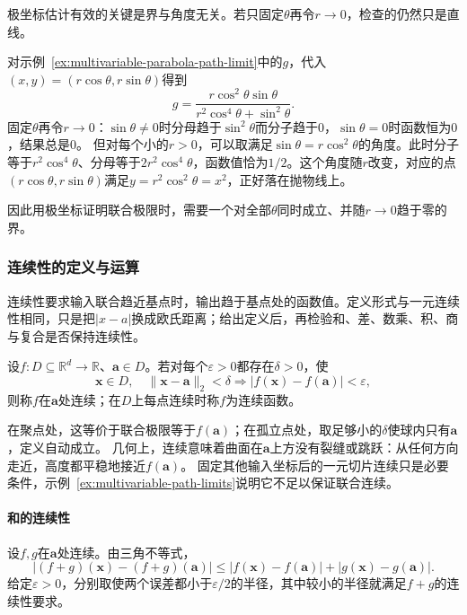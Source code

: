 极坐标估计有效的关键是界与角度无关。若只固定$\theta$再令$r\to0$，检查的仍然只是直线。
\begin{example}[固定角度的极坐标检验]
\label{ex:multivariable-polar-fixed-angle}
对示例~\ref{ex:multivariable-parabola-path-limit}中的$g$，代入$(x,y)=(r\cos\theta,r\sin\theta)$得到
\[
 g=\frac{r\cos^2\theta\sin\theta}{r^2\cos^4\theta+\sin^2\theta}.
\]
固定$\theta$再令$r\to0$：$\sin\theta\neq0$时分母趋于$\sin^2\theta$而分子趋于$0$，$\sin\theta=0$时函数恒为$0$，结果总是$0$。
但对每个小的$r>0$，可以取满足$\sin\theta=r\cos^2\theta$的角度。此时分子等于$r^2\cos^4\theta$、分母等于$2r^2\cos^4\theta$，函数值恰为$1/2$。这个角度随$r$改变，对应的点$(r\cos\theta,r\sin\theta)$满足$y=r^2\cos^2\theta=x^2$，正好落在抛物线上。
\end{example}

因此用极坐标证明联合极限时，需要一个对全部$\theta$同时成立、并随$r\to0$趋于零的界。

\subsubsection{连续性的定义与运算}
\label{sec:multivariable-continuity}

连续性要求输入联合趋近基点时，输出趋于基点处的函数值。定义形式与一元连续性相同，只是把$|x-a|$换成欧氏距离；给出定义后，再检验和、差、数乘、积、商与复合是否保持连续性。
\begin{definition}[多元标量函数的连续性]
\label{def:multivariable-scalar-continuity}
设$f:D\subseteq\mathbb R^d\to\mathbb R$、$\bm a\in D$。若对每个$\varepsilon>0$都存在$\delta>0$，使
\[
 \bm x\in D,\quad\lVert\bm x-\bm a\rVert_2<\delta
 \Longrightarrow |f(\bm x)-f(\bm a)|<\varepsilon,
\]
则称$f$在$\bm a$处连续；在$D$上每点连续时称$f$为连续函数。
\end{definition}
在聚点处，这等价于联合极限等于$f(\bm a)$；在孤立点处，取足够小的$\delta$使球内只有$\bm a$，定义自动成立。
几何上，连续意味着曲面在$\bm a$上方没有裂缝或跳跃：从任何方向走近，高度都平稳地接近$f(\bm a)$。
固定其他输入坐标后的一元切片连续只是必要条件，示例~\ref{ex:multivariable-path-limits}说明它不足以保证联合连续。

\paragraph{和的连续性}
设$f,g$在$\bm a$处连续。由三角不等式，
\[
 |(f+g)(\bm x)-(f+g)(\bm a)|\leq|f(\bm x)-f(\bm a)|+|g(\bm x)-g(\bm a)|.
\]
给定$\varepsilon>0$，分别取使两个误差都小于$\varepsilon/2$的半径，其中较小的半径就满足$f+g$的连续性要求。

